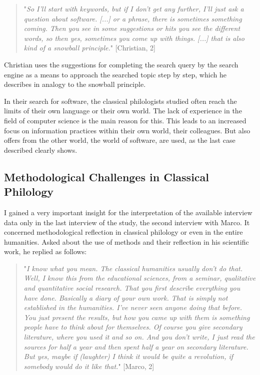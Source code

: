 \documentclass[12pt, a4paper, titlepage, oneside, abstract=true, toc=listof, toc=bibliography, BCOR=1cm]{scrreprt}
\begin{document}
{%
\begin{quotation}
"\textit{So I'll start with keywords, but if I don't get any further, I'll just ask a question about software. [...] or a phrase, there is sometimes something coming. Then you see in some suggestions or hits you see the different words, so then yes, sometimes you come up with things. [...] that is also kind of a snowball principle.}" [Christian, 2]
\end{quotation}

Christian uses the suggestions for completing the search query by the search engine as a means to approach the searched topic step by step, which he describes in analogy to the snowball principle.

In their search for software, the classical philologists studied often reach the limits of their own language or their own world. The lack of experience in the field of computer science is the main reason for this. This leads to an increased focus on information practices within their own world, their colleagues. But also offers from the other world, the world of software, are used, as the last case described clearly shows.

\subsection{Methodological Challenges in Classical Philology}
\label{sec:method_deficits}
I gained a very important insight for the interpretation of the available interview data only in the last interview of the study, the second interview with Marco. It concerned methodological reflection in classical philology or even in the entire humanities. Asked about the use of methods and their reflection in his scientific work, he replied as follows: 

\begin{quotation}
"\textit{I know what you mean. The classical humanities usually don't do that. Well, I know this from the educational sciences, from a seminar, qualitative and quantitative social research. That you first describe everything you have done. Basically a diary of your own work. That is simply not established in the humanities. I've never seen anyone doing that before. You just present the results, but how you came up with them is something people have to think about for themselves. Of course you give secondary literature, where you used it and so on. And you don't write, I just read the sources for half a year and then spent half a year on secondary literature. But yes, maybe if (laughter) I think it would be quite a revolution, if somebody would do it like that.}" [Marco, 2]
\end{quotation}

}
\end{document}
